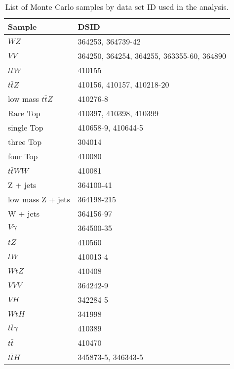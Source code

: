 \begin{table}[]
    \centering
    \begin{tabular}{l|l}
        \hline\hline
        Sample & DSID \\
        \hline\hline
        $WZ$ & 364253, 364739-42 \\
        $VV$ & 364250, 364254, 364255, 363355-60, 364890 \\
        $t\bar{t}W$ & 410155 \\
        $t\bar{t}Z$ & 410156, 410157, 410218-20 \\
        low mass $t\bar{t}Z$ & 410276-8 \\
        Rare Top & 410397, 410398, 410399 \\
        single Top & 410658-9, 410644-5 \\
        three Top & 304014 \\
        four Top & 410080 \\
        $t\bar{t}WW$ & 410081 \\
        Z + jets & 364100-41 \\
        low mass Z + jets & 364198-215 \\
        W + jets & 364156-97 \\
        $V\gamma$ & 364500-35 \\
        $tZ$  & 410560 \\
        $tW$  & 410013-4 \\
        $WtZ$ & 410408 \\
        $VVV$ & 364242-9 \\
        $VH$ & 342284-5 \\
        $WtH$ & 341998 \\
        $t\bar{t}\gamma$ & 410389 \\
        $t\bar{t}$ & 410470 \\
        $t\bar{t}H$ & 345873-5, 346343-5 \\
        \hline\hline
    \end{tabular}
    \caption{List of Monte Carlo samples by data set ID used in the analysis.}
    \label{tab:dsids}
\end{table}
